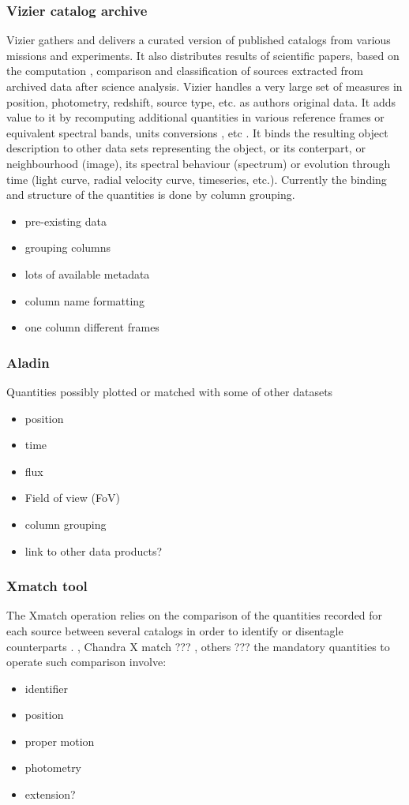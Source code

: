 \documentclass[11pt,a4paper]{ivoa}
\begin{document}
\subsubsection{Vizier catalog archive  }
Vizier gathers and delivers a curated version of published catalogs from various missions and experiments.
It also distributes results of scientific papers, based on the computation , comparison and classification of sources extracted from archived data after science analysis.
Vizier handles a very large set of measures in position, photometry, redshift, source type, etc. as authors original data.
It adds value to it by recomputing additional quantities in various reference frames or equivalent spectral bands, units conversions , etc .
It binds the resulting object description to other data sets representing the object, or its conterpart, or neighbourhood (image), its spectral behaviour (spectrum) or evolution through time (light curve, radial velocity curve, timeseries, etc.).
Currently the binding and structure of the quantities is done by column grouping.
\begin{itemize}
    \item pre-existing data
    \item grouping columns
    \item lots of available metadata
    \item column name formatting
    \item one column different frames
\end{itemize}

\subsubsection{Aladin}

Quantities possibly plotted or matched with some of other datasets
\begin{itemize}
    \item position
    \item time
    \item flux
    \item Field of view (FoV)
    \item column grouping
    \item link to other data products?
\end{itemize}

\subsubsection{X\-match tool }
The Xmatch operation relies on the comparison of the quantities recorded for each source between several catalogs in order to identify or disentagle counterparts .
\cite{F-X algo}, Chandra X match ??? , others ???
the mandatory quantities to operate such comparison involve:
\begin{itemize}
    \item identifier
    \item position
    \item proper motion
    \item photometry
    \item extension?
\end{itemize}
\end{document}
